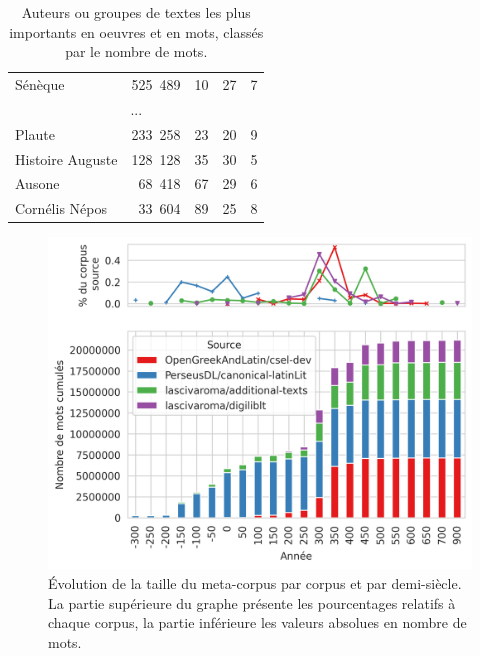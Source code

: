 {\begin{table}
\begin{minipage}{.56\linewidth}
{\begin{tabular}{l|rr|rr}
                     Sénèque &   525~489 &         10 &       27 &             7 \\ 
                            \multicolumn{5}{c}{...}                \\
                      Plaute &   233~258 &         23 &       20 &             9 \\
            Histoire Auguste &   128~128 &         35 &       30 &             5 \\
                      Ausone &    68~418 &         67 &       29 &             6 \\
              Cornélis Népos &    33~604 &         89 &       25 &             8 \\
            \bottomrule
        \end{tabular}%
        }
        \caption{Auteurs ou groupes de textes les plus importants en oeuvres et en mots, classés par le nombre de mots.}
        \label{tab:chap1:rang-auteurs}
\end{minipage}
\end{table}
\begin{figure}
    \centering
    \includegraphics[width=.9\linewidth]{figures/chap1/part2/motsPaCorpus.png}
    \caption{Évolution de la taille du meta-corpus par corpus et par demi-siècle. La partie supérieure du graphe présente les pourcentages relatifs à chaque corpus, la partie inférieure les valeurs absolues en nombre de mots.}
    \label{fig:chap1:mots-par-corpus}
\end{figure}
\clearpage
}

